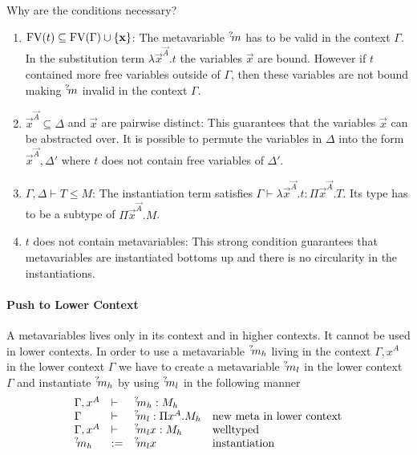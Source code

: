 Why are the conditions necessary?
\begin{enumerate}
    \item ${\text{FV}}(t) \subseteq {\text{FV}}(\Gamma) \cup {\{{\mathbf x}\}}$: The metavariable
        ${{}^? \kern-0.2em m}$ has to be valid in the context $\Gamma$. In the substitution
        term $\lambda \vec x^{\vec A}. t$ the variables $\vec x$ are bound. However
        if $t$ contained more free variables outside of $\Gamma$, then these
        variables are not bound making ${{}^? \kern-0.2em m}$ invalid in the context
        $\Gamma$.

    \item $\vec x^{\vec A} \subseteq \Delta$ and $\vec x$ are pairwise distinct:
        This guarantees that the variables $\vec x$ can be abstracted over. It
        is possible to permute the variables in $\Delta$ into the form $\vec
        x^{\vec A}, \Delta'$ where $t$ does not contain free variables of
        $\Delta'$.

    \item $\Gamma, \Delta \vdash T \le M$: The instantiation term satisfies
        $\Gamma \vdash \lambda \vec x^{\vec A}. t : \Pi \vec x^{\vec A}. T$.
        Its type has to be a subtype of $\Pi \vec x^{\vec A}. M$.

    \item $t$ does not contain metavariables: This strong condition guarantees
        that metavariables are instantiated bottoms up and there is no
        circularity in the instantiations.
\end{enumerate}





\paragraph{Push to Lower Context} A metavariables lives only in its context and
in higher contexts. It cannot be used in lower contexts. In order to use a
metavariable ${{}^? \kern-0.2em m}_h$ living in the context $\Gamma, x^A$ in the lower
context $\Gamma$ we have to create a metavariable ${{}^? \kern-0.2em m}_l$ in the lower
context $\Gamma$ and instantiate ${{}^? \kern-0.2em m}_h$ by using ${{}^? \kern-0.2em m}_l$ in the
following manner
$$
\begin{array}{lllll} 
    \Gamma, x^A &\vdash& {{}^? \kern-0.2em m}_h: M_h
    \\
    \Gamma &\vdash& {{}^? \kern-0.2em m}_l: \Pi x^A.M_h
    &\text{new meta in lower context}
    \\
    \Gamma, x^A &\vdash& {{}^? \kern-0.2em m}_l x : M_h
    &\text{welltyped}
    \\
    {{}^? \kern-0.2em m}_h &:=& {{}^? \kern-0.2em m}_l x &\text{instantiation}
 \end{array}
$$






